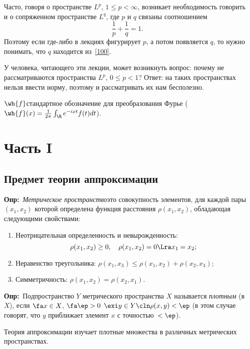 \documentclass[a4paper]{article}
\def\defin{\noindent\textbf{Опр:}\ }
\begin{document}
Часто, говоря о пространстве $L^p$, $1\le p<\infty$, возникает
необходимость говорить и о сопряженном пространстве $L^q$, где $p$
и $q$ связаны соотношением
\begin{equation}\label{100}
\frac1p+\frac1q=1.
\end{equation}
Поэтому если где-либо в лекциях фигурирует $p$, а потом появляется
$q$, то нужно понимать, что $q$ находится из~\eqref{100}.

\medskip

У человека, читающего эти лекции, может возникнуть вопрос: почему
не рассматриваются пространства $L^p$, $0\le p<1$? Ответ: на таких
пространствах нельзя ввести норму, поэтому и рассматривать их нам
бесполезно.

\medskip

$\wh{f}$\т стандартное обозначение для преобразования Фурье (
$\wh{f}(x)=\frac1{2\pi}\int_\R e^{-ixt}f(t)dt$).

\newpage

\tableofcontents
\newpage

\section{Часть I}

\subsection{Предмет теории аппроксимации}

\defin \emph{Метрическое пространство}\т это совокупность элементов, для каждой пары $(x_1,x_2)$ которой
определена функция расстояния $\rho(x_1,x_2)$, обладающая следующими свойствами:
\begin{enumerate}
  \item Неотрицательная определенность и невырожденность:
    $$\rho(x_1,x_2) \ge 0,\quad \rho(x_1,x_2)=0\Lra x_1=x_2;$$
  \item Неравенство треугольника: $\rho(x_1,x_3)\le\rho(x_1,x_2)+\rho(x_2,x_3)$;
  \item Симметричность: $\rho(x_1,x_2)=\rho(x_2,x_1)$.
\end{enumerate}

\defin Подпространство $Y$ метрического пространства $X$
называется \emph{плотным} (в $X$), если $\fa x\in X$, $\fa\ep>0$ $\exi y\in Y\cln \rho(x,y)<\ep$
(в этом случае говорят, что $y$ приближает элемент $x$ с точностью~$<\ep$).

Теория аппроксимации изучает плотные множества в различных метрических пространствах.
\end{document}
